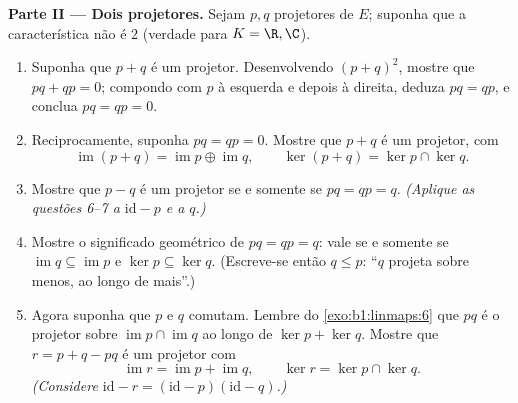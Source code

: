 \begin{problem}
\medskip
\noindent\textbf{Parte II --- Dois projetores.} Sejam $p, q$
projetores de $E$; suponha que a característica não é $2$
(verdade para $K = \R, \C$).
\begin{enumerate}[resume]
  \item Suponha que $p + q$ é um projetor. Desenvolvendo $(p + q)^2$,
        mostre que $pq + qp = 0$; compondo com $p$ à esquerda e depois à
        direita, deduza $pq = qp$, e conclua $pq = qp =
        0$.
  \item Reciprocamente, suponha $pq = qp = 0$. Mostre que $p + q$ é um
        projetor, com
        \[
        \operatorname{im}(p + q) = \operatorname{im} p \oplus
        \operatorname{im} q,
        \qquad
        \ker(p + q) = \ker p \cap \ker q .
        \]
  \item Mostre que $p - q$ é um projetor se e somente se $pq = qp
        = q$.
        \emph{(Aplique as questões 6--7 a $\mathrm{id} - p$ e a $q$.)}
  \item Mostre o significado geométrico de $pq = qp = q$: vale se e somente
        se $\operatorname{im} q \subseteq
        \operatorname{im} p$ e $\ker p \subseteq \ker q$. (Escreve-se então $q \leq p$: ``$q$ projeta
        sobre menos, ao longo de mais''.)
  \item Agora suponha que $p$ e $q$ comutam. Lembre do \cref{exo:b1:linmaps:6} que
        $pq$ é o projetor sobre $\operatorname{im} p \cap \operatorname{im} q$ ao longo de $\ker p + \ker q$. Mostre que
        $r = p + q - pq$ é um projetor com
        \[
        \operatorname{im} r = \operatorname{im} p +
        \operatorname{im} q,
        \qquad
        \ker r = \ker p \cap \ker q .
        \]
        \emph{(Considere $\mathrm{id} - r = (\mathrm{id} -
        p)(\mathrm{id} - q)$.)}
\end{enumerate}


\end{problem}
